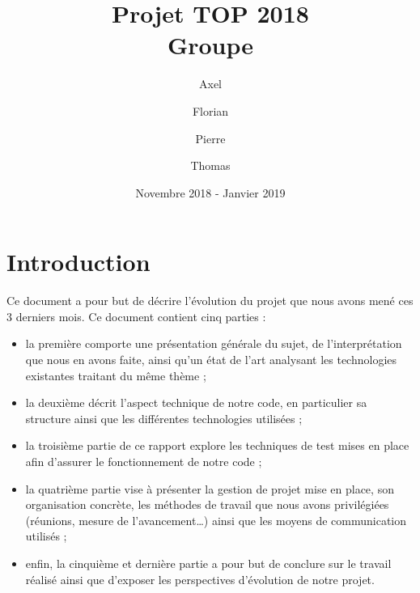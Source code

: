 \documentclass[a4paper, 12pt]{report}
\title{
    Projet TOP 2018 \\%
    Groupe \sc{a2}%
}
\author{
    Axel \sc{Thouvenin}
    \and
    Florian \sc{Vogt}
    \and
    Pierre \sc{Bouillon}
    \and
    Thomas \sc{Bagrel}
}
\date{Novembre 2018 - Janvier 2019}
\begin{document}
\maketitle

\tableofcontents{}






\part*{Introduction}\label{part:intro}

Ce document a pour but de décrire l'évolution du projet que nous avons mené ces 3 derniers mois. Ce document contient cinq parties :
\begin{itemize}
    \item la première comporte une présentation générale du sujet, de l'interprétation que nous en avons faite, ainsi qu'un état de l'art analysant les technologies existantes traitant du même thème ;
    \item la deuxième décrit l'aspect technique de notre code, en particulier sa structure ainsi que les différentes technologies utilisées ;
    \item la troisième partie de ce rapport explore les techniques de test mises en place afin d'assurer le fonctionnement de notre code ;
    \item la quatrième partie vise à présenter la gestion de projet mise en place, son organisation concrète, les méthodes de travail que nous avons privilégiées (réunions, mesure de l'avancement\ldots{}) ainsi que les moyens de communication utilisés ;
    \item enfin, la cinquième et dernière partie a pour but de conclure sur le travail réalisé ainsi que d'exposer les perspectives d'évolution de notre projet.
\end{itemize}
\end{document}
